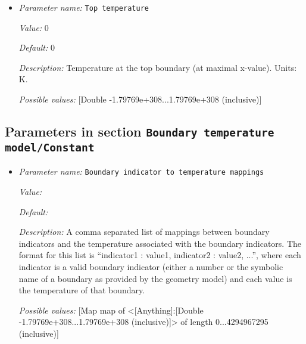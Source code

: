 \begin{itemize}
{\it Value:} 0


{\it Default:} 0


{\it Description:} Temperature at the right boundary (at maximal x-value). Units: K.


{\it Possible values:} [Double -1.79769e+308...1.79769e+308 (inclusive)]
\item {\it Parameter name:} {\tt Top temperature}
\label{parameters:Boundary temperature model/Box/Top temperature}


{\it Value:} 0


{\it Default:} 0


{\it Description:} Temperature at the top boundary (at maximal x-value). Units: K.


{\it Possible values:} [Double -1.79769e+308...1.79769e+308 (inclusive)]
\end{itemize}

\subsection{Parameters in section \tt Boundary temperature model/Constant}
\label{parameters:Boundary_20temperature_20model/Constant}

\begin{itemize}
\item {\it Parameter name:} {\tt Boundary indicator to temperature mappings}
\label{parameters:Boundary temperature model/Constant/Boundary indicator to temperature mappings}


{\it Value:} 


{\it Default:} 


{\it Description:} A comma separated list of mappings between boundary indicators and the temperature associated with the boundary indicators. The format for this list is ``indicator1 : value1, indicator2 : value2, ...'', where each indicator is a valid boundary indicator (either a number or the symbolic name of a boundary as provided by the geometry model) and each value is the temperature of that boundary.


{\it Possible values:} [Map map of <[Anything]:[Double -1.79769e+308...1.79769e+308 (inclusive)]> of length 0...4294967295 (inclusive)]
\end{itemize}

